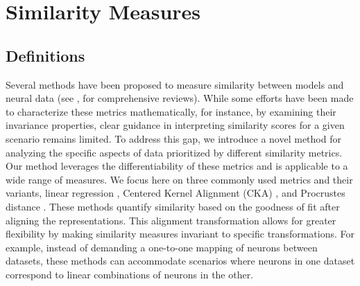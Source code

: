 \documentclass{article} %
\begin{document}
\section{Similarity Measures} \label{appendix:similarity_measures}


\subsection{Definitions} \label{appendix:measures}

Several methods have been proposed to measure similarity between models and neural data (see \citep{sucholutsky2023getting}, \citep{klabunde2023similarity} for comprehensive reviews). 
While some efforts have been made to characterize these metrics mathematically, for instance, by examining their invariance properties, clear guidance in interpreting similarity scores for a given scenario remains limited. %
To address this gap, we introduce a novel method for analyzing the specific aspects of data prioritized by different similarity metrics. Our method leverages the differentiability of these metrics and is applicable to a wide range of measures.
We focus here on three commonly used metrics and their variants, linear regression \citep{YaminsHong2014, SchrimpfKubilius2018}, Centered Kernel Alignment (CKA) \citep{Kornblith2019}, and Procrustes distance \citep{Williams2021, ding2021grounding}. 
These methods quantify similarity based on the goodness of fit after aligning the representations. This alignment transformation allows for greater flexibility by making similarity measures invariant to specific transformations. For example, instead of demanding a one-to-one mapping of neurons between datasets, these methods can accommodate scenarios where neurons in one dataset correspond to linear combinations of neurons in the other.
\end{document}
